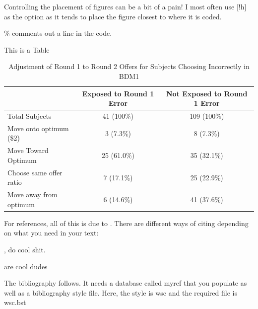 \documentclass[11pt,letter]{article}
\begin{document}
Controlling the placement of figures can be a bit of a pain! I most often use [!h] as the option as it tends to place the figure closest to where it is coded.

\% comments out a line in the code. 




This is a Table

\begin{table}[h]
\centering  
\caption{Adjustment of Round 1 to Round 2 Offers for Subjects Choosing Incorrectly in BDM1}  \small
\label{exposedBDM1}
\begin{tabular}{lcc}\hline
                               &               Exposed to Round 1 Error & Not Exposed to Round 1 Error              \\ \hline 
                              
Total Subjects           & 41 (100\%)                   & 109 (100\%) \\
Move onto optimum (\$2)  & 3 (7.3\%)                    & 8 (7.3\%)   \\
Move Toward Optimum      & 25 (61.0\%)                  & 35 (32.1\%) \\
Choose same offer ratio  & 7 (17.1\%)                   & 25 (22.9\%) \\
Move away from optimum   & 6 (14.6\%)                   & 41 (37.6\%) \\ \hline
\end{tabular}
\end{table}


For references, all of this is due to \citet{simsetal2016}. There are different ways of citing depending on what you need in your text:

\citet{simsetal2016}

\citep{simsetal2016}, do cool shit.

\citeauthor{simsetal2016} are cool dudes

The bibliography follows. It needs a database called myref that you populate as well as a bibliography style file. Here, the style is wsc and the required file is wsc.bst


\newpage






 
\end{document}
